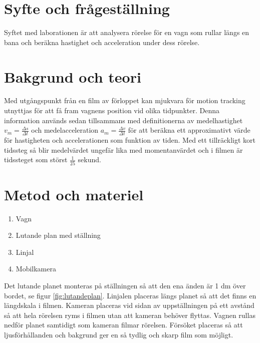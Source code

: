 \documentclass[11p, titlepage, oneside, a4paper]{article}
\begin{document}
	\newpage

	
	\setlength{\parindent}{0pt}
	\setlength{\parskip}{10pt}
	
	\section{Syfte och frågeställning}
		Syftet med laborationen är att analysera rörelse för en vagn som rullar längs en bana och beräkna hastighet och acceleration under dess rörelse.

	\section{Bakgrund och teori}
        Med utgångspunkt från en film av förloppet kan mjukvara för motion tracking utnyttjas för att få fram vagnens position vid olika tidpunkter. Denna information används sedan tillsammans med definitionerna av medelhastighet $v_m = \frac{\Delta s}{\Delta t}$ och medelacceleration $a_m = \frac{\Delta v}{\Delta t}$ för att beräkna ett approximativt värde för hastigheten och accelerationen som funktion av tiden. Med ett tillräckligt kort tidssteg så blir medelvärdet ungefär lika med momentanvärdet och i filmen är tidssteget som störst $\frac{1}{25}$ sekund.  \parencite{impuls}
	

	\section{Metod och materiel}
        \begin{enumerate}
            \item Vagn
            \item Lutande plan med ställning
            \item Linjal
            \item Mobilkamera
        \end{enumerate}
        
        Det lutande planet monteras på ställningen så att den ena änden är 1 dm över bordet, se figur \ref{fig:lutandeplan}. Linjalen placeras längs planet så att det finns en längdskala  i filmen. Kameran placeras vid sidan av uppställningen på ett avstånd så att hela rörelsen ryms i filmen utan att kameran behöver flyttas. Vagnen rullas nedför planet samtidigt som kameran filmar rörelsen. Försöket placeras så att ljusförhållanden och bakgrund ger en så tydlig och skarp film som möjligt.
        
\end{document}
